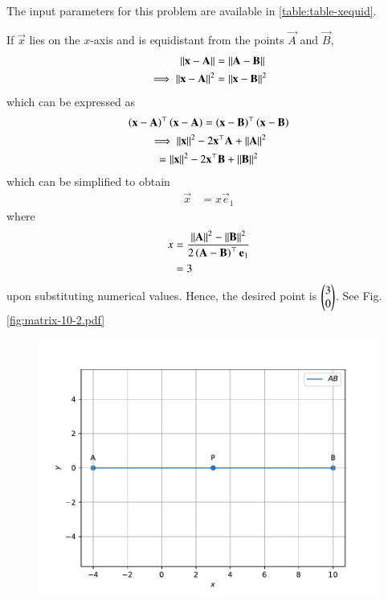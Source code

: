 \documentclass[journal,12pt,twocolumn]{IEEEtran}
\renewcommand\thesection{\arabic{section}}
\begin{document}
\begin{enumerate}[label=\thesection.\arabic*.,ref=\thesection.\theenumi]
\solution The input parameters for this problem are available in 
\eqref{table:table-xequid}.	
\begin{table}[ht!]
	
\caption{}
\label{table:table-xequid}	
\end{table}
		If $\vec{x}$ lies on the  $x$-axis and is  equidistant from the points $\vec{A}$ and $\vec{B}$, 
\begin{align}
	\left\lVert\mathbf{x}-\mathbf{A}\right\rVert &=
\left\lVert\mathbf{A}-\mathbf{B}\right\rVert 
\\
	\implies \left\lVert\mathbf{x}-\mathbf{A}\right\rVert^2 &=
\left\lVert\mathbf{x}-\mathbf{B}\right\rVert^2 
\end{align}
which can be expressed as 
\begin{multline}
	\left(\mathbf{x}-\mathbf{A}\right)^{\top} \left(\mathbf{x}-\mathbf{A}\right)=
	\left(\mathbf{x}-\mathbf{B}\right)^{\top} 
\left(\mathbf{x}-\mathbf{B}\right)
\\
	\implies	\left\lVert\mathbf{x}\right\rVert^2-2{\mathbf{x}}^{\top}\mathbf{A} + \left\lVert\mathbf{A}\right\rVert^2
	\\= \left\lVert\mathbf{x}\right\rVert^2-2{\mathbf{x}}^{\top}\mathbf{B} + \left\lVert\mathbf{B}\right\rVert^2
\end{multline}
which can be simplified to obtain
  \begin{align}
	  \vec{x} &=
	   x\vec{e}_1
  \end{align}
  where 
  \begin{align}
	  x &=\frac{\left\lVert\mathbf{A}\right\rVert^2 -\left\lVert\mathbf{B}\right\rVert^2 }{2\left(\mathbf{A}-\mathbf{B}\right)^{\top }\mathbf{e}_1
}
\\
	  &= 3
	  \label{eq:cbse_10_x}
  \end{align}
upon   substituting numerical values. 
Hence, the desired point is $\begin{pmatrix} 3 \\ 0\end{pmatrix}$.
    See Fig. 
	  \ref{fig:matrix-10-2.pdf}
  \begin{figure}
	  \centering 
	  \includegraphics[width=\columnwidth]{figs/matrix-10-2.pdf}

\end{figure}
\end{enumerate}
\end{document}
